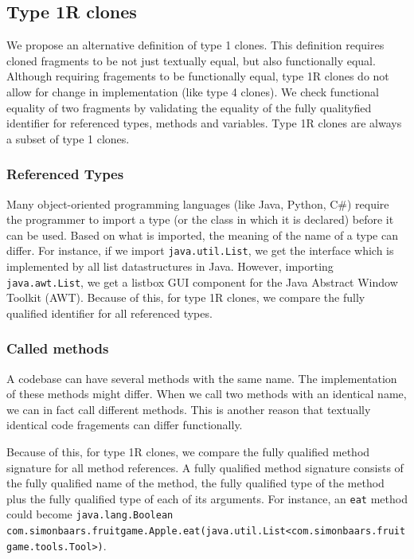 \subsection{Type 1R clones} \label{chap:type1rclones}
We propose an alternative definition of type 1 clones. This definition requires cloned fragments to be not just textually equal, but also functionally equal. Although requiring fragements to be functionally equal, type 1R clones do not allow for change in implementation (like type 4 clones). We check functional equality of two fragments by validating the equality of the fully qualityfied identifier for referenced types, methods and variables. Type 1R clones are always a subset of type 1 clones.

\subsubsection{Referenced Types}
Many object-oriented programming languages (like Java, Python, C\#) require the programmer to import a type (or the class in which it is declared) before it can be used. Based on what is imported, the meaning of the name of a type can differ. For instance, if we import \texttt{java.util.List}, we get the interface which is implemented by all list datastructures in Java. However, importing \texttt{java.awt.List}, we get a listbox GUI component for the Java Abstract Window Toolkit (AWT). Because of this, for type 1R clones, we compare the fully qualified identifier for all referenced types.

\subsubsection{Called methods}
A codebase can have several methods with the same name. The implementation of these methods might differ. When we call two methods with an identical name, we can in fact call different methods. This is another reason that textually identical code fragements can differ functionally.

Because of this, for type 1R clones, we compare the fully qualified method signature for all method references. A fully qualified method signature consists of the fully qualified name of the method, the fully qualified type of the method plus the fully qualified type of each of its arguments. For instance, an \texttt{eat} method could become \texttt{java.lang.Boolean com.simonbaars.fruitgame.Apple.eat(java.util.List<com.simonbaars.fruitgame.tools.Tool>)}.


